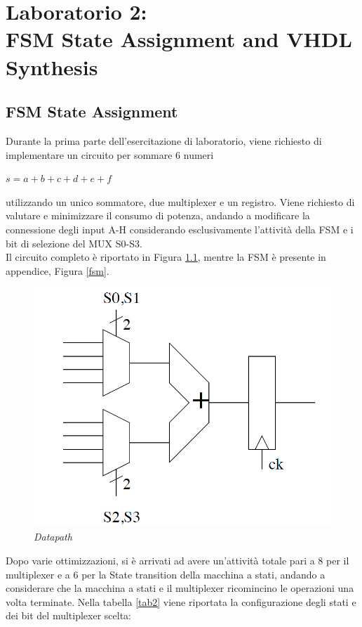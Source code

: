 \chapter{Laboratorio 2: \\FSM State Assignment and VHDL Synthesis}
\section{FSM State Assignment}
Durante la prima parte dell'esercitazione di laboratorio, viene richiesto di implementare un circuito per sommare 6 numeri
\begin{center}
	$s=a+b+c+d+e+f $
\end{center}
utilizzando un unico sommatore, due multiplexer e un registro. Viene richiesto di valutare e minimizzare il consumo di potenza, andando a modificare la connessione degli input A-H considerando esclusivamente l'attività della FSM e i bit di selezione del MUX S0-S3.\\
Il circuito completo è riportato in Figura \ref{circuito}, mentre la FSM è presente in appendice, Figura \ref{fsm}.
\begin{figure}[!htb]
	\centering
	\includegraphics[scale=0.6]{immagini/circuito}
	\caption{\textit{Datapath}}
	\label{circuito}
\end{figure} 
Dopo varie ottimizzazioni, si è arrivati ad avere un'attività totale pari a 8 per il multiplexer e a 6 per la State transition della macchina a stati, andando a considerare che la macchina a stati e il multiplexer ricomincino le operazioni una volta terminate. Nella tabella \ref{tab2} viene riportata la configurazione degli stati e dei bit del multiplexer scelta:
